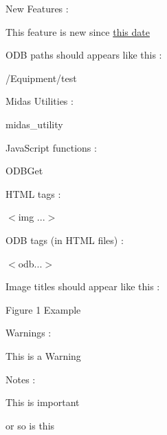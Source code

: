 \begin{DoxyItemize}
\item New Features :
\begin{DoxyItemize}
\item  This feature is new since \hyperlink{NDF}{this date} 
\end{DoxyItemize}
\item ODB paths should appears like this :
\begin{DoxyItemize}
\item  /Equipment/test \par

\end{DoxyItemize}
\item Midas Utilities :
\begin{DoxyItemize}
\item midas\_\-utility\par

\end{DoxyItemize}
\item JavaScript functions :
\begin{DoxyItemize}
\item ODBGet\par

\end{DoxyItemize}
\item HTML tags :
\begin{DoxyItemize}
\item $<$img ...$>$ \par

\end{DoxyItemize}
\item ODB tags (in HTML files) :
\begin{DoxyItemize}
\item $<$odb...$>$ \par

\end{DoxyItemize}
\item Image titles should appear like this :
\begin{DoxyItemize}
\item  Figure 1 Example \par

\end{DoxyItemize}
\item Warnings :
\begin{DoxyItemize}
\item This is a Warning \par

\end{DoxyItemize}
\item Notes :
\begin{DoxyItemize}
\item This is important \par

\end{DoxyItemize}
\item or  so is this
\end{DoxyItemize}

\par
\par
\par


\label{index_end}
\hypertarget{index_end}{}
 

\par
 